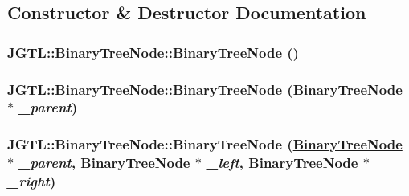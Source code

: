\subsection{Constructor \& Destructor Documentation}
\hypertarget{class_j_g_t_l_1_1_binary_tree_node_4aa523a728d1099d8fc993ef79b228db}{
\subsubsection[BinaryTreeNode]{\setlength{\rightskip}{0pt plus 5cm}JGTL::Binary\-Tree\-Node::Binary\-Tree\-Node ()}}
\label{class_j_g_t_l_1_1_binary_tree_node_4aa523a728d1099d8fc993ef79b228db}


\hypertarget{class_j_g_t_l_1_1_binary_tree_node_d27a8918fa259e2f48945571793e3ca3}{
\subsubsection[BinaryTreeNode]{\setlength{\rightskip}{0pt plus 5cm}JGTL::Binary\-Tree\-Node::Binary\-Tree\-Node (\hyperlink{class_j_g_t_l_1_1_binary_tree_node}{Binary\-Tree\-Node} $\ast$ {\em \_\-parent})}}
\label{class_j_g_t_l_1_1_binary_tree_node_d27a8918fa259e2f48945571793e3ca3}


\hypertarget{class_j_g_t_l_1_1_binary_tree_node_94268eedc62f4bb5d9217a951926f362}{
\subsubsection[BinaryTreeNode]{\setlength{\rightskip}{0pt plus 5cm}JGTL::Binary\-Tree\-Node::Binary\-Tree\-Node (\hyperlink{class_j_g_t_l_1_1_binary_tree_node}{Binary\-Tree\-Node} $\ast$ {\em \_\-parent}, \hyperlink{class_j_g_t_l_1_1_binary_tree_node}{Binary\-Tree\-Node} $\ast$ {\em \_\-left}, \hyperlink{class_j_g_t_l_1_1_binary_tree_node}{Binary\-Tree\-Node} $\ast$ {\em \_\-right})}}
\label{class_j_g_t_l_1_1_binary_tree_node_94268eedc62f4bb5d9217a951926f362}


